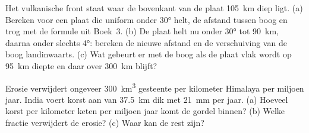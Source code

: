 \begin{exercise}[$\star\star\star$]\label{exo:b2:himalaya-andes:11}
Het vulkanische front staat waar de bovenkant van de plaat \qty{105}{km} diep ligt. (a) Bereken voor een plaat
die uniform onder \ang{30} helt, de afstand tussen boog en trog met de formule uit
Boek~3. (b) De plaat helt nu onder \ang{30} tot \qty{90}{km}, daarna onder slechts \ang{4}: bereken
de nieuwe afstand en de verschuiving van de boog landinwaarts. (c) Wat gebeurt er met de boog als de plaat vlak wordt
op \qty{95}{km} diepte en daar over \qty{300}{km} blijft?
\end{exercise}

\begin{exercise}[$\star\star\star$]\label{exo:b2:himalaya-andes:12}
Erosie verwijdert ongeveer \qty{300}{km^3} gesteente per kilometer Himalaya per miljoen jaar.
India voert korst aan van \qty{37.5}{km} dik met \qty{21}{mm} per jaar. (a) Hoeveel korst per
kilometer keten per miljoen jaar komt de gordel binnen? (b) Welke fractie verwijdert de erosie?
(c) Waar kan de rest zijn?
\end{exercise}

